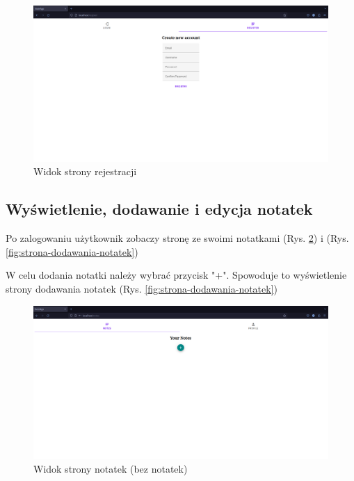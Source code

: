 \documentclass[a4paper,twoside,12pt]{book}
\begin{document}
\begin{figure}[H]
\centering
\includegraphics[width=1.0\textwidth]{./images/strona-rejestracji.png}
\caption{Widok strony rejestracji}
\label{fig:strona-rejestracji}
\end{figure}

\subsection{Wyświetlenie, dodawanie i edycja notatek}

Po zalogowaniu użytkownik zobaczy stronę ze swoimi notatkami
(Rys. \ref{fig:strona-notatek}) i (Rys. \ref{fig:strona-dodawania-notatek})

W celu dodania notatki należy wybrać przycisk "+". 
Spowoduje to wyświetlenie strony dodawania notatek (Rys. \ref{fig:strona-dodawania-notatek})

\begin{figure}[H]
\centering
\includegraphics[width=1.0\textwidth]{./images/strona-notatek.png}
\caption{Widok strony notatek (bez notatek)}
\label{fig:strona-notatek}
\end{figure}
\end{document}
